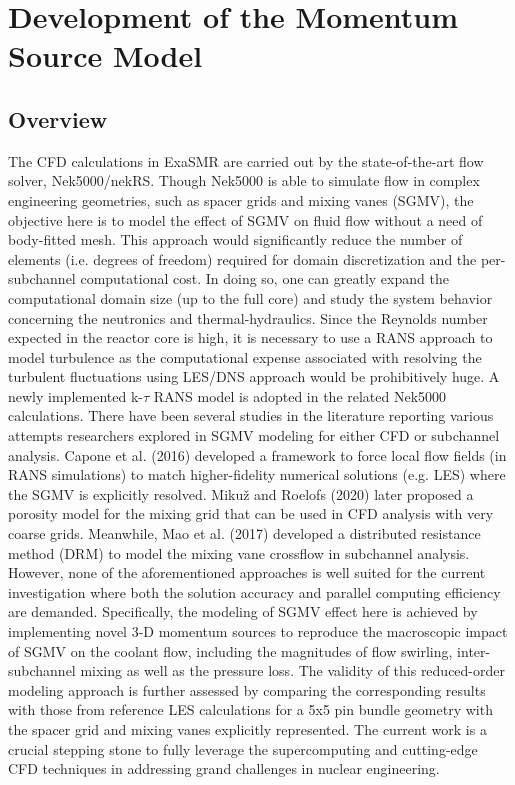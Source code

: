 \section{Development of the Momentum Source Model}
\label{sec:msm}

\subsection{Overview}
\label{sec:msm1}

The CFD calculations in ExaSMR are carried out by the state-of-the-art flow solver, Nek5000/nekRS. 
Though Nek5000 is able to simulate flow in complex engineering geometries, such as spacer grids and mixing vanes (SGMV)\cite{BUSCO2019144}, the objective here is to model the effect of SGMV on fluid flow without a need of body-fitted mesh. 
This approach would significantly reduce the number of elements (i.e. degrees of freedom) required for domain discretization and the per-subchannel computational cost. In doing so, one can greatly expand the computational domain size (up to the full core) and study the system behavior concerning the neutronics and thermal-hydraulics. 
Since the Reynolds number expected in the reactor core is high, it is necessary to use a RANS approach to model turbulence as the computational expense associated with resolving the turbulent fluctuations using LES/DNS approach would be prohibitively huge. 
A newly implemented k-$\tau$ RANS model is adopted in the related Nek5000 calculations. 
There have been several studies in the literature reporting various attempts researchers explored in SGMV modeling for either CFD or subchannel analysis. 
Capone et al. (2016) developed a framework to force local flow fields (in RANS simulations) to match higher-fidelity numerical solutions (e.g. LES) where the SGMV is explicitly resolved.\cite{Capone2016}
Mikuž and Roelofs (2020) later proposed a porosity model for the mixing grid that can be used in CFD analysis with very coarse grids.\cite{Mikuz2020} 
Meanwhile, Mao et al. (2017) developed a distributed resistance method (DRM) to model the mixing vane crossflow in subchannel analysis.\cite{Mao2017} 
However, none of the aforementioned approaches is well suited for the current investigation where both the solution accuracy and parallel computing efficiency are demanded. 
Specifically, the modeling of SGMV effect here is achieved by implementing novel 3-D momentum sources to reproduce the macroscopic impact of SGMV on the coolant flow, including the magnitudes of flow swirling, inter-subchannel mixing as well as the pressure loss. 
The validity of this reduced-order modeling approach is further assessed by comparing the corresponding results with those from reference LES calculations for a 5x5 pin bundle geometry with the spacer grid and mixing vanes explicitly represented. 
The current work is a crucial stepping stone to fully leverage the supercomputing and cutting-edge CFD techniques in addressing grand challenges in nuclear engineering. 


